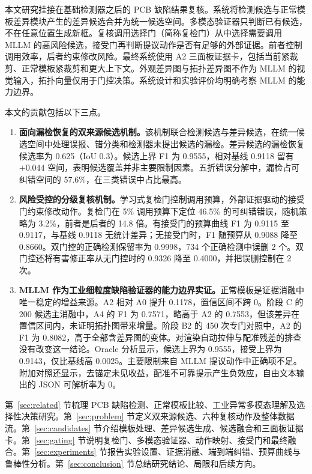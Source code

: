 本文研究挂接在基础检测器之后的 PCB 缺陷结果复核。系统将检测候选与正常模板差异模块产生的差异候选合并为统一候选空间。多模态验证器只判断已有候选，不在任意位置生成新框。复核调用选择门（简称复检门）从中选择需要调用 MLLM 的高风险候选，接受门再判断提议动作是否有足够的外部证据。前者控制调用效率，后者约束修改风险。最终系统使用 A2 三面板证据卡，包括当前紧裁剪、正常模板紧裁剪和更大上下文。外观差异图与拓扑差异图不作为 MLLM 的视觉输入，拓扑向量仅用于门控决策。系统设计和实验评价均明确考察 MLLM 的能力边界。

本文的贡献包括以下三点。

\begin{enumerate}
  \item \textbf{面向漏检恢复的双来源候选机制。}该机制联合检测候选与差异候选，在统一候选空间中处理误报、错分类和检测器未提出候选的漏检。差异候选的漏检恢复候选率为 0.625（IoU 0.3）。候选上界 F1 为 0.9555，相对基线 0.9118 留有 $+0.044$ 空间，表明候选覆盖并非主要限制因素。五折错误分解中，漏检占可纠错空间的 57.6\%，在三类错误中占比最高。

  \item \textbf{风险受控的分级复核机制。}学习式复检门控制调用预算，外部证据驱动的接受门约束修改动作。复检门在 5\% 调用预算下定位 46.5\% 的可纠错错误，随机策略为 3.2\%，前者是后者的 14.8 倍。有接受门的预算曲线 F1 为 0.9115 至 0.9117，与基线 0.9118 无统计差异；无接受门时，F1 随预算从 0.9088 降至 0.8660。双门控的正确检测保留率为 0.9998，734 个正确检测中误删 2 个。双门控还将有害修正率从无门控时的 0.9326 降至 0.4000，并把误删控制在 2 次。

  \item \textbf{MLLM 作为工业细粒度缺陷验证器的能力边界实证。}正常模板是证据消融中唯一稳定的增益来源。A2 相对 A0 提升 0.1178，置信区间不跨 0。阶段 C 的 200 候选主消融中，A4 的 F1 为 0.7571，略高于 A2 的 0.7553，但该差异在置信区间内，未证明拓扑图带来增量。阶段 B2 的 450 次专门对照中，A2 的 F1 为 0.8082，高于全部含差异图的变体。对渲染自动拉伸与配准残差的排查没有改变这一结论。Oracle 分析显示，候选上界为 0.9555，接受上界为 0.9143，仅比基线高 0.0025。主要限制来自 MLLM 提议动作中正确项不足。附加对照还显示，去锚定未见收益，配准不可靠提示产生负效应，自由文本输出的 JSON 可解析率为 0。
\end{enumerate}

第~\ref{sec:related} 节梳理 PCB 缺陷检测、正常模板比较、工业异常多模态理解及选择性决策研究。第~\ref{sec:problem} 节定义双来源候选、六种复核动作及整体数据流。第~\ref{sec:candidates} 节介绍模板处理、差异候选生成、候选融合和三面板证据卡。第~\ref{sec:gating} 节说明复检门、多模态验证器、动作映射、接受门和最终融合。第~\ref{sec:experiments} 节报告实验设置、证据消融、端到端纠错、预算曲线与鲁棒性分析。第~\ref{sec:conclusion} 节总结研究结论、局限和后续方向。

